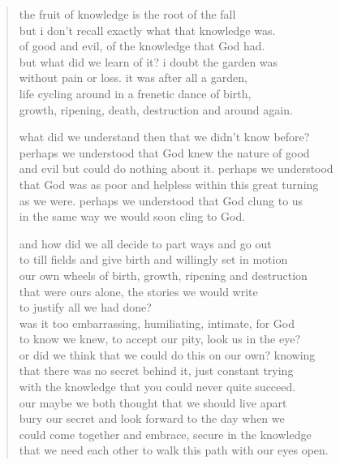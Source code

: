 
\begin{verse}
the fruit of knowledge is the root of the fall \\
but i don't recall exactly what that knowledge was.\\
of good and evil, of the knowledge that God had. \\
but what did we learn of it? i doubt the garden was \\
without pain or loss. it was after all a garden,  \\
life cycling around in a frenetic dance of birth,  \\
growth, ripening, death, destruction and around again.

what did we understand then that we didn't know before? \\
perhaps we understood that God knew the nature of good \\
and evil but could do nothing about it. perhaps we understood \\
that God was as poor and helpless within this great turning \\
as we were. perhaps we understood that God clung to us \\
in the same way we would soon cling to God.

and how did we all decide to part ways and go out \\
to till fields and give birth and willingly set in motion  \\
our own wheels of birth, growth, ripening and destruction \\
that were ours alone, the stories we would write  \\
to justify all we had done? \\
was it too embarrassing, humiliating, intimate, for God \\
to know we knew, to accept our pity, look us in the eye? \\
or did we think that we could do this on our own? knowing \\
that there was no secret behind it, just constant trying \\
with the knowledge that you could never quite succeed.  \\
our maybe we both thought that we should live apart \\
bury our secret and look forward to the day when we \\
could come together and embrace, secure in the knowledge \\
that we need each other to walk this path with our eyes open.
\end{verse}

